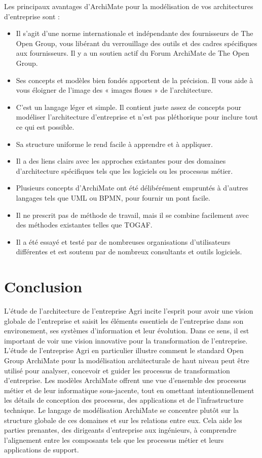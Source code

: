 \documentclass[a4paper]{report}
\begin{document}
\begin{doublespace}
Les principaux avantages d'ArchiMate pour la modélisation de vos
architectures d'entreprise sont :

\begin{itemize}
\item
  Il s'agit d'une norme internationale et indépendante des fournisseurs
  de The Open Group, vous libérant du verrouillage des outils et des
  cadres spécifiques aux fournisseurs. Il y a un soutien actif du Forum
  ArchiMate de The Open Group.
\item
  Ses concepts et modèles bien fondés apportent de la précision. Il vous
  aide à vous éloigner de l'image des « images floues » de
  l'architecture.
\item
  C'est un langage léger et simple. Il contient juste assez de concepts
  pour modéliser l'architecture d'entreprise et n'est pas pléthorique
  pour inclure tout ce qui est possible.
\item
  Sa structure uniforme le rend facile à apprendre et à appliquer.
\item
  Il a des liens clairs avec les approches existantes pour des domaines
  d'architecture spécifiques tels que les logiciels ou les processus
  métier.
\item
  Plusieurs concepts d'ArchiMate ont été délibérément empruntés à
  d'autres langages tels que UML ou BPMN, pour fournir un pont facile.
\item
  Il ne prescrit pas de méthode de travail, mais il se combine
  facilement avec des méthodes existantes telles que TOGAF.
\item
  Il a été essayé et testé par de nombreuses organisations
  d'utilisateurs différentes et est soutenu par de nombreux consultants
  et outils logiciels.
\end{itemize}

\chapter*{\centering Conclusion}
L'étude de l'architecture de l'entreprise Agri incite l'esprit pour
avoir une vision globale de l'entreprise et saisit les éléments
essentiels de l'entreprise dans son environement, ses systèmes d'information et leur évolution. Dans ce sens, il est
important de voir une vision innovative pour la transformation de l'entreprise. L'étude de l'entreprise Agri en
particulier illustre comment le standard Open Group ArchiMate pour la
modélisation architecturale de haut niveau peut être utilisé pour analyser, concevoir et guider les processus de transformation
d'entreprise. Les modèles ArchiMate offrent une vue d'ensemble des processus métier et de leur
informatique sous-jacente, tout en omettant intentionnellement les détails de conception des
processus, des applications et de l'infrastructure technique. Le langage de modélisation ArchiMate se
concentre plutôt sur la structure globale de ces domaines et sur les relations entre eux. Cela
aide les parties prenantes, des dirigeants d'entreprise aux ingénieurs, à comprendre l'alignement
entre les composants tels que les processus métier et leurs applications de support.

\end{doublespace}
\end{document}
